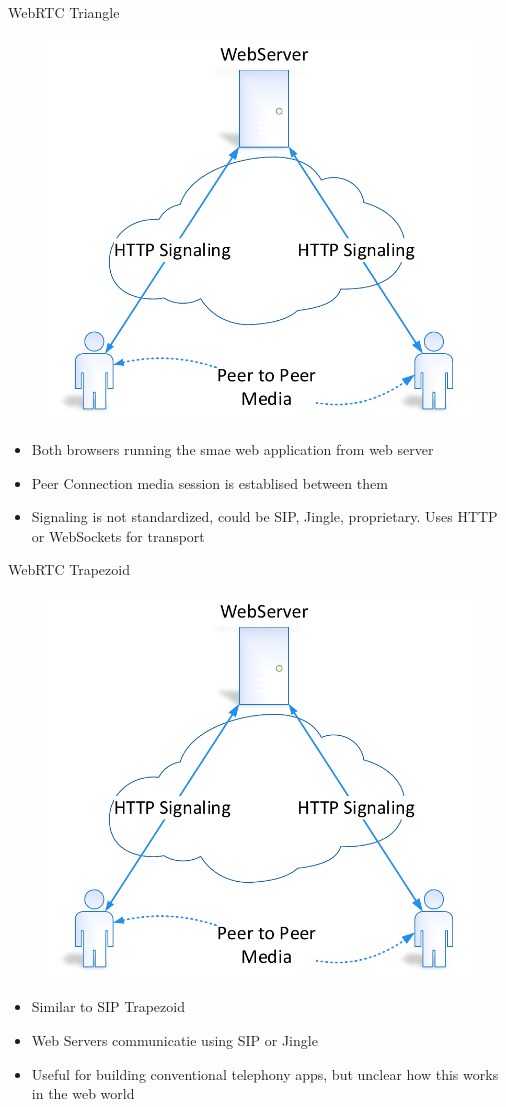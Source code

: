 \begin{frame}{WebRTC Triangle}
\begin{figure}
\includegraphics[page=3,width=.6\textwidth]{image/webrtc.pdf}
\end{figure}
\begin{itemize}
\item Both browsers running the smae web application from web server
\item Peer Connection media session is establised between them
\item Signaling is not standardized, could be SIP, Jingle, proprietary. Uses HTTP or WebSockets for transport
\end{itemize}
\end{frame}

\begin{frame}{WebRTC Trapezoid}
\begin{figure}
\includegraphics[page=4,width=.6\textwidth]{image/webrtc.pdf}
\end{figure}
\begin{itemize}
\item Similar to SIP Trapezoid
\item Web Servers communicatie using SIP or Jingle
\item Useful for building conventional telephony apps, but unclear how this works in the web world
\end{itemize}
\end{frame}

